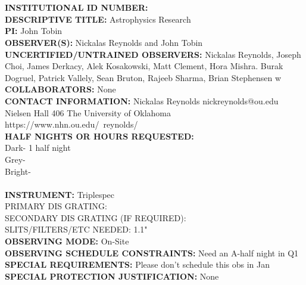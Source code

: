 \documentclass[11pt]{article}
\begin{document}
%
\section*{}
\bigskip

\noindent\textbf{INSTITUTIONAL ID NUMBER:}%
\smallskip\\
\textbf{DESCRIPTIVE TITLE:} Astrophysics Research %
\smallskip\\
\textbf{PI:} John Tobin %
\smallskip\\
\textbf{OBSERVER(S):} Nickalas Reynolds and John Tobin %
\smallskip\\
\textbf{UNCERTIFIED/UNTRAINED OBSERVERS:} Nickalas Reynolds, Joseph Choi, James Derkacy, Alek Kosakowski, Matt Clement, Hora Mishra. Burak Dogruel, Patrick Vallely, Sean Bruton, Rajeeb Sharma, Brian Stephensen
w %
\smallskip\\
\textbf{COLLABORATORS:} None %
\smallskip\\
\textbf{CONTACT INFORMATION:} 
Nickalas Reynolds
nickreynolds@ou.edu
Nielsen Hall 406
The University of Oklahoma
https://www.nhn.ou.edu/~reynolds/
\smallskip\\
\textbf{HALF NIGHTS OR HOURS REQUESTED:} \\%
Dark- 1 half night\\
Grey- \\
Bright- \\
\smallskip\\
\textbf{INSTRUMENT:} 
Triplespec \\%
PRIMARY DIS GRATING:\\
SECONDARY DIS GRATING (IF REQUIRED):\\
SLITS/FILTERS/ETC NEEDED: 1.1"
\smallskip\\
\textbf{OBSERVING MODE:} On-Site %
\smallskip\\
\textbf{OBSERVING SCHEDULE CONSTRAINTS:} Need an A-half night in Q1 %
\smallskip\\
\textbf{SPECIAL REQUIREMENTS:} Please don't schedule this obs in Jan %
\smallskip\\
\textbf{SPECIAL PROTECTION JUSTIFICATION:} None %
\end{document}
